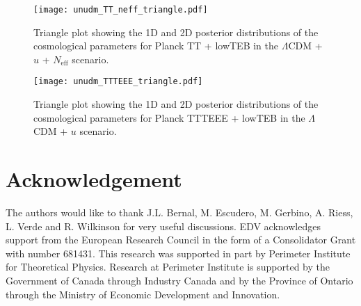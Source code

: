 \documentclass[aps,prd,a4paper,twocolumn,amsmath,showpacs,superscriptaddress,nofootinbib,preprintnumbers]{revtex4-1}
\newcommand{\neff}{N_{\mathrm{eff}}}
\begin{document}
\begin{figure*}
\centering
\texttt{[image: unudm\_TT\_neff\_triangle.pdf]}
\caption{Triangle plot showing the 1D and 2D posterior distributions of the cosmological parameters for Planck TT + lowTEB in the $\Lambda$CDM + $u$ + $\neff$ scenario.}
\label{fig2}
\end{figure*}

\begin{figure*}
\centering
\texttt{[image: unudm\_TTTEEE\_triangle.pdf]}
\caption{Triangle plot showing the 1D and 2D posterior distributions of the cosmological parameters for Planck TTTEEE + lowTEB in the $\Lambda$CDM + $u$ scenario.}
\label{fig3}
\end{figure*}

\section*{Acknowledgement}
The authors would like to thank J.L. Bernal, M. Escudero, M. Gerbino, A. Riess, L. Verde and R. Wilkinson for very useful discussions.   
EDV acknowledges support from the European Research Council in the form of a Consolidator Grant with number 681431. This research was supported in part by Perimeter Institute for Theoretical Physics. Research at Perimeter Institute is supported by the Government of Canada through Industry Canada and by the Province of Ontario through the Ministry of Economic Development and Innovation.  
\end{document}
